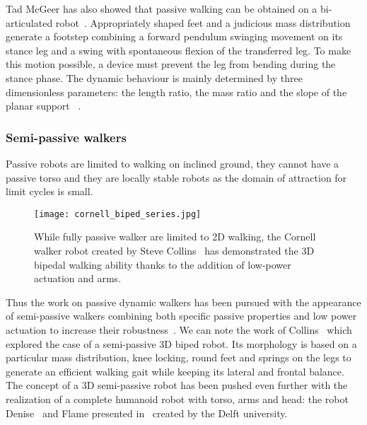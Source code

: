 Tad McGeer has also showed that passive walking can be obtained on a bi-articulated robot~\parencite{mcgeer1992principles}. Appropriately shaped feet  and a judicious mass distribution generate a footstep combining a forward pendulum swinging movement on its stance leg and a swing with spontaneous flexion of the transferred leg. To make this motion possible, a device must prevent the leg from bending during the stance phase.
The dynamic behaviour is mainly determined by three dimensionless parameters: the length ratio, the mass ratio and the slope of the planar support ~\parencite{Garcia1998}.


\subsubsection{Semi-passive walkers} %
Passive robots are limited to walking on inclined ground, they cannot have a passive torso and they are locally stable robots as the domain of attraction for limit cycles is small.

\begin{figure}[tb]
    \begin{center}
        \texttt{[image: cornell\_biped\_series.jpg]}
    \end{center}
    \caption{While fully passive walker are limited to 2D walking, the Cornell walker robot created by Steve Collins~\parencite{collins2005bipedal} has demonstrated the 3D bipedal walking ability thanks to the addition of low-power actuation and arms. }
    \label{fig:cornell-biped}
\end{figure}

Thus the work on passive dynamic walkers has been pursued with the appearance of semi-passive walkers combining both specific passive properties and low power actuation to increase their robustness~\parencite{Anderson2005}. We can note the work of Collins~\parencite{collins2005bipedal} which explored the case of a semi-passive 3D biped robot. Its morphology is based on a particular mass distribution, knee locking, round feet and springs on the legs to generate an efficient walking gait while keeping its lateral and frontal balance. The concept of a 3D semi-passive robot has been pushed even further with the realization of a complete humanoid robot with torso, arms and head: the robot Denise~\parencite{wisse2005three} and Flame presented in~\parencite{Hobbelen2008} created by the Delft university.

%


